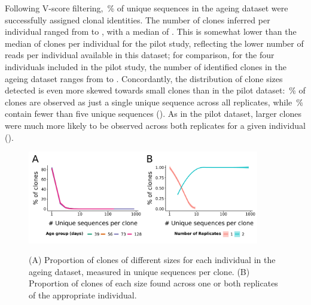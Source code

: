 Following V-score filtering, \,\% of unique sequences in the ageing dataset were successfully assigned clonal identities. The number of clones inferred per individual ranged from  to , with a median of . This is somewhat lower than the median of  clones per individual for the pilot study, reflecting the lower number of reads per individual available in this dataset; for comparison, for the four individuals included in the pilot study, the number of identified clones in the ageing dataset ranges from  to .
Concordantly, the distribution of clone sizes detected is even more skewed towards small clones than in the pilot dataset: \,\% of clones are observed as just a single unique sequence across all replicates, while \,\% contain fewer than five unique sequences (). As in the pilot dataset, larger clones were much more likely to be observed across both replicates for a given individual  ().


\begin{figure}
\centering
\includegraphics[width = 0.9\textwidth]{_Figures/png/ageing-clone-sizes}
\begin{subfigure}{0em}
\label{fig:igseq-ageing-clone-sizes-sizes}
\end{subfigure}
\begin{subfigure}{0em}
\label{fig:igseq-ageing-clone-sizes-reps}
\end{subfigure}
\caption{(A) Proportion of clones of different sizes for each individual in the ageing dataset, measured in unique sequences per clone. (B) Proportion of clones of each size found across one or both replicates of the appropriate individual.}
\label{fig:igseq-ageing-clone-sizes}
\end{figure}

